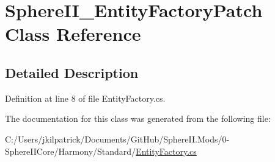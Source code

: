 \hypertarget{class_sphere_i_i___entity_factory_patch}{}\section{Sphere\+I\+I\+\_\+\+Entity\+Factory\+Patch Class Reference}
\label{class_sphere_i_i___entity_factory_patch}


\subsection{Detailed Description}


Definition at line 8 of file Entity\+Factory.\+cs.



The documentation for this class was generated from the following file\+:\begin{DoxyCompactItemize}
\item 
C\+:/\+Users/jkilpatrick/\+Documents/\+Git\+Hub/\+Sphere\+I\+I.\+Mods/0-\/\+Sphere\+I\+I\+Core/\+Harmony/\+Standard/\mbox{\hyperlink{_entity_factory_8cs}{Entity\+Factory.\+cs}}\end{DoxyCompactItemize}
